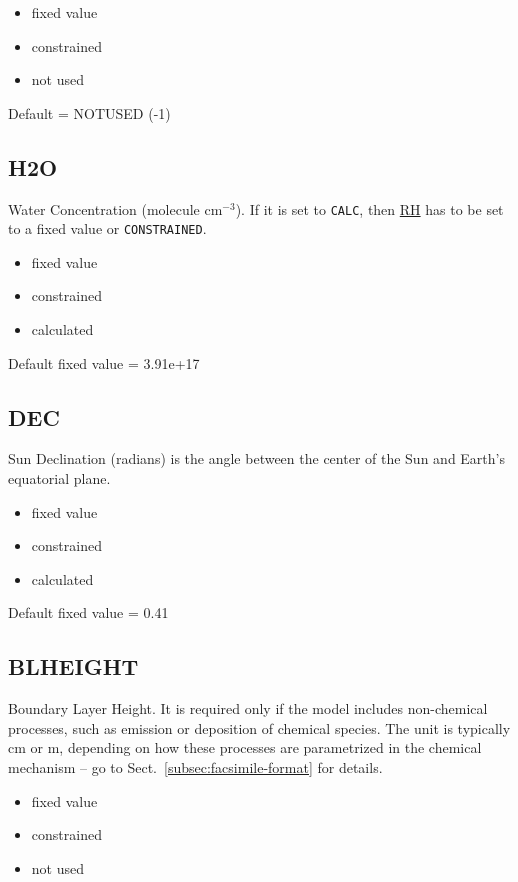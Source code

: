 \begin{itemize}
\item fixed value
\item constrained
\item not used
\end{itemize}

Default = NOTUSED (-1)

\subsection{H2O} \label{subsec:h2o}

Water Concentration (molecule cm$^{-3}$). If it is set to \texttt{CALC},
then \hyperref[subsec:rh]{RH} has to be set to a fixed value or
\texttt{CONSTRAINED}.

\begin{itemize}
\item fixed value
\item constrained
\item calculated
\end{itemize}

Default fixed value = 3.91e+17

\subsection{DEC} \label{subsec:dec}

Sun Declination (radians) is the angle between the center of the Sun
and Earth's equatorial plane.

\begin{itemize}
\item fixed value
\item constrained
\item calculated
\end{itemize}

Default fixed value = 0.41

\subsection{BLHEIGHT} \label{subsec:blheight}

Boundary Layer Height. It is required only if the model includes
non-chemical processes, such as emission or deposition of chemical
species. The unit is typically cm or m, depending on how these
processes are parametrized in the chemical mechanism -- go to
Sect.~\ref{subsec:facsimile-format} for details.

\begin{itemize}
\item fixed value
\item constrained
\item not used
\end{itemize}

